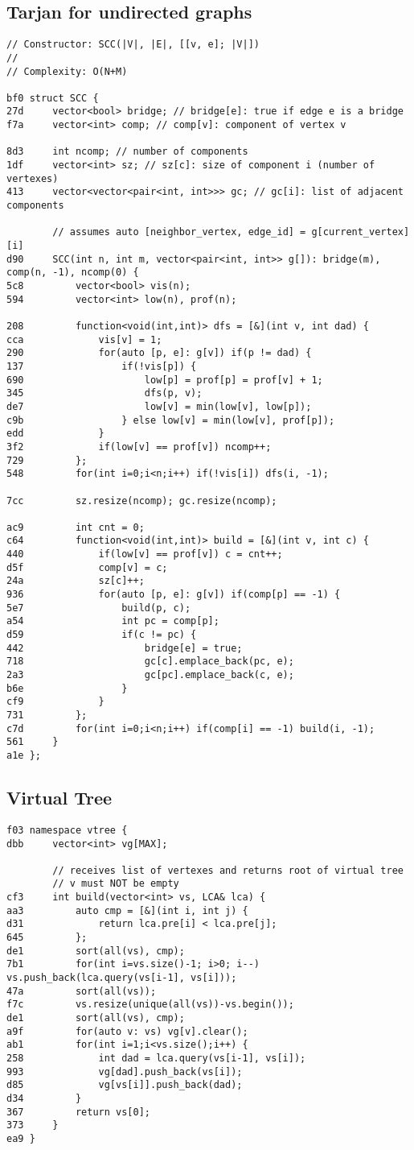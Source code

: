 \documentclass[11pt, a4paper, twoside]{article}
\begin{document}
\subsection{Tarjan for undirected graphs}
\begin{lstlisting}
// Constructor: SCC(|V|, |E|, [[v, e]; |V|])
//
// Complexity: O(N+M)

bf0 struct SCC {
27d 	vector<bool> bridge; // bridge[e]: true if edge e is a bridge
f7a 	vector<int> comp; // comp[v]: component of vertex v
    
8d3 	int ncomp; // number of components
1df 	vector<int> sz; // sz[c]: size of component i (number of vertexes)
413 	vector<vector<pair<int, int>>> gc; // gc[i]: list of adjacent components
    				
    	// assumes auto [neighbor_vertex, edge_id] = g[current_vertex][i]
d90 	SCC(int n, int m, vector<pair<int, int>> g[]): bridge(m), comp(n, -1), ncomp(0) {
5c8 		vector<bool> vis(n);
594 		vector<int> low(n), prof(n);
    
208 		function<void(int,int)> dfs = [&](int v, int dad) {
cca 			vis[v] = 1;
290 			for(auto [p, e]: g[v]) if(p != dad) {
137 				if(!vis[p]) {
690 					low[p] = prof[p] = prof[v] + 1;
345 					dfs(p, v);
de7 					low[v] = min(low[v], low[p]);
c9b 				} else low[v] = min(low[v], prof[p]);
edd 			}
3f2 			if(low[v] == prof[v]) ncomp++;
729 		};
548 		for(int i=0;i<n;i++) if(!vis[i]) dfs(i, -1);
    
7cc 		sz.resize(ncomp); gc.resize(ncomp);
    
ac9 		int cnt = 0;
c64 		function<void(int,int)> build = [&](int v, int c) {
440 			if(low[v] == prof[v]) c = cnt++;
d5f 			comp[v] = c;
24a 			sz[c]++;
936 			for(auto [p, e]: g[v]) if(comp[p] == -1) {
5e7 				build(p, c);
a54 				int pc = comp[p];
d59 				if(c != pc) {
442 					bridge[e] = true;
718 					gc[c].emplace_back(pc, e);
2a3 					gc[pc].emplace_back(c, e);
b6e 				}
cf9 			}
731 		};
c7d 		for(int i=0;i<n;i++) if(comp[i] == -1) build(i, -1);
561 	}
a1e };
\end{lstlisting}

\subsection{Virtual Tree}
\begin{lstlisting}
f03 namespace vtree {
dbb 	vector<int> vg[MAX];
    
    	// receives list of vertexes and returns root of virtual tree
    	// v must NOT be empty
cf3 	int build(vector<int> vs, LCA& lca) {
aa3 		auto cmp = [&](int i, int j) {
d31 			return lca.pre[i] < lca.pre[j];
645 		};
de1 		sort(all(vs), cmp);
7b1 		for(int i=vs.size()-1; i>0; i--) vs.push_back(lca.query(vs[i-1], vs[i]));
47a 		sort(all(vs));
f7c 		vs.resize(unique(all(vs))-vs.begin());
de1 		sort(all(vs), cmp);
a9f 		for(auto v: vs) vg[v].clear();
ab1 		for(int i=1;i<vs.size();i++) {
258 			int dad = lca.query(vs[i-1], vs[i]);
993 			vg[dad].push_back(vs[i]);
d85 			vg[vs[i]].push_back(dad);
d34 		}
367 		return vs[0];
373 	}
ea9 }
\end{lstlisting}
\end{document}
